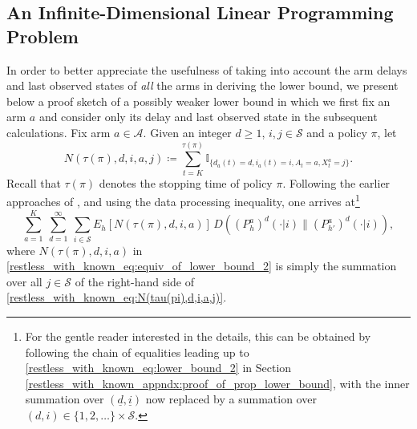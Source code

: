 \subsection{An Infinite-Dimensional Linear Programming Problem} \label{restless_with_known_appndx:infinite_dimensional_LP}
In order to better appreciate the usefulness of taking into account the arm delays and last observed states of \emph{all} the arms in deriving the lower bound, we present below a {\color{black} proof sketch} of a possibly weaker lower bound in which we first fix an arm $a$ and consider only its delay and last observed state in the subsequent calculations. Fix arm $a\in\mathcal{A}$. Given an integer $d\geq 1$, $i,j\in\mathcal{S}$ and a policy $\pi$, let
\begin{equation}
	N(\tau(\pi),d,i,a,j)\coloneqq \sum\limits_{t=K}^{\tau(\pi)}\mathbb{I}_{\{d_a(t)=d,i_a(t)=i,A_t=a,X_t^a=j\}}\label{restless_with_known_eq:N(tau(pi),d,i,a,j)}.
\end{equation}
Recall that $\tau(\pi)$ denotes the stopping time of policy $\pi$. Following the earlier approaches of \cite{Vaidhiyan2017, vaidhiyan2012active, vaidhiyan2017learning, prabhu2017optimal}, and using the data processing inequality, one arrives at\footnote{For the gentle reader interested in the details, this can be obtained by following the chain of equalities leading up to \eqref{restless_with_known_eq:lower_bound_2} in Section \ref{restless_with_known_appndx:proof_of_prop_lower_bound}, with the inner summation over $(\underline{d},\underline{i})$ now replaced by a summation over $(d,i)\in\{1,2,\ldots\}\times \mathcal{S}$.}
\begin{equation}
	\sum\limits_{a=1}^{K}~\sum\limits_{d=1}^{\infty}~\sum\limits_{i\in\mathcal{S}}E_h[N(\tau(\pi),d,i,a)]\,D((P_h^a)^{d}(\cdot|i)\|(P_{h'}^a)^{d}(\cdot|i)),\label{restless_with_known_eq:equiv_of_lower_bound_2}
\end{equation}
where $N(\tau(\pi),d,i,a)$ in \eqref{restless_with_known_eq:equiv_of_lower_bound_2} is simply the summation over all $j\in\mathcal{S}$ of the right-hand side of \eqref{restless_with_known_eq:N(tau(pi),d,i,a,j)}. 

